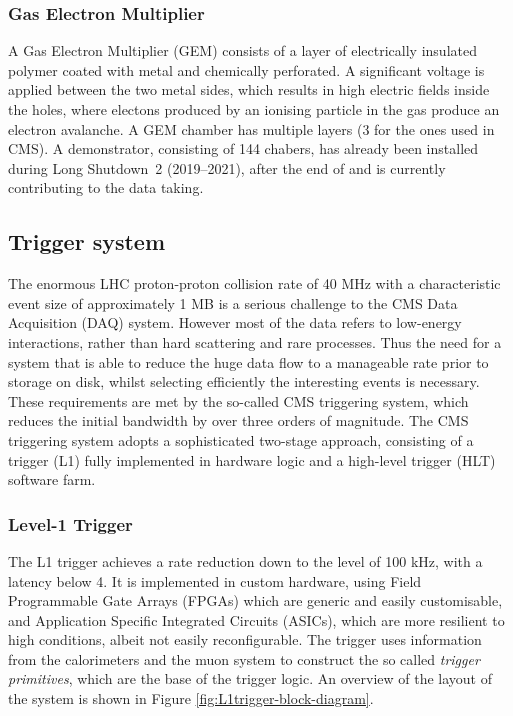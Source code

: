 \subsubsection{Gas Electron Multiplier}
A Gas Electron Multiplier (GEM) consists of a layer of electrically insulated polymer coated with metal and chemically perforated.
A significant voltage is applied between the two metal sides, which results in high electric fields inside the holes,
where electons produced by an ionising particle in the gas produce an electron avalanche.
A GEM chamber has multiple layers (3 for the ones used in CMS).
A demonstrator, consisting of 144 chabers, has already been installed during Long Shutdown~2 (2019--2021),
after the end of  and is currently contributing to the  data taking.

\subsection{Trigger system}
The enormous LHC proton-proton collision rate of 40 MHz with a characteristic event size of approximately 1 MB
is a serious challenge to the CMS Data Acquisition (DAQ) system.
However most of the data refers to low-energy interactions, rather than hard scattering and rare processes.
Thus the need for a system that is able to reduce the huge data flow to a manageable rate prior to storage on disk,
whilst selecting efficiently the interesting events is necessary.
These requirements are met by the so-called CMS triggering system,
which reduces the initial bandwidth by over three orders of magnitude.
The CMS triggering system adopts a sophisticated two-stage approach,
consisting of a \Lone trigger (L1) fully implemented in hardware logic and a high-level trigger (HLT) software farm.

\subsubsection{Level-1 Trigger}
\label{sec:L1trigger}
The L1 trigger achieves a rate reduction down to the level of 100 kHz, with a latency below 4\mus.
It is implemented in custom hardware, using Field Programmable Gate Arrays (FPGAs) which are generic and easily customisable,
and Application Specific Integrated Circuits (ASICs), which are more resilient to high \pileup{} conditions, albeit not easily reconfigurable.
The \Lone trigger uses information from the calorimeters and the muon system to construct the so called \textit{trigger primitives},
which are the base of the trigger logic.
An overview of the layout of the system is shown in Figure \ref{fig:L1trigger-block-diagram}.

